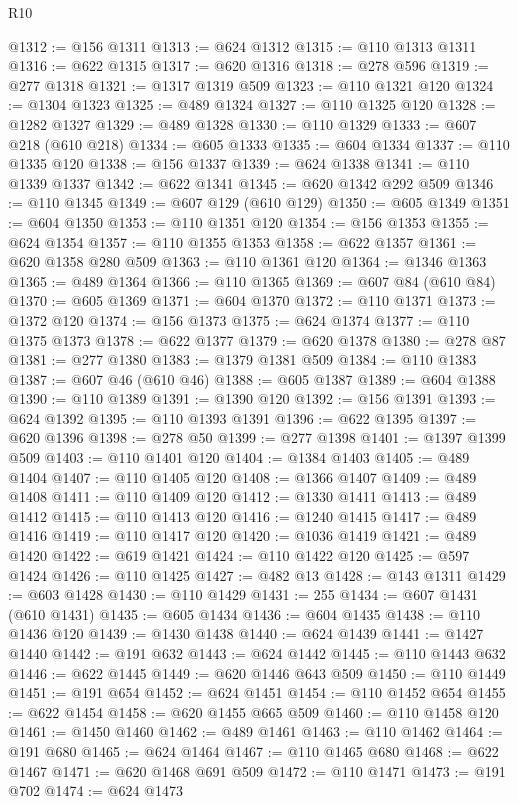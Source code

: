 \begin{lexlean}{R10}
\begin{coremodule}
@1312 := @156 @1311
@1313 := @624 @1312
@1315 := @110 @1313 @1311
@1316 := @622 @1315
@1317 := @620 @1316
@1318 := @278 @596
@1319 := @277 @1318
@1321 := @1317 @1319 @509
@1323 := @110 @1321 @120
@1324 := @1304 @1323
@1325 := @489 @1324
@1327 := @110 @1325 @120
@1328 := @1282 @1327
@1329 := @489 @1328
@1330 := @110 @1329
@1333 := @607 @218 (@610 @218)
@1334 := @605 @1333
@1335 := @604 @1334
@1337 := @110 @1335 @120
@1338 := @156 @1337
@1339 := @624 @1338
@1341 := @110 @1339 @1337
@1342 := @622 @1341
@1345 := @620 @1342 @292 @509
@1346 := @110 @1345
@1349 := @607 @129 (@610 @129)
@1350 := @605 @1349
@1351 := @604 @1350
@1353 := @110 @1351 @120
@1354 := @156 @1353
@1355 := @624 @1354
@1357 := @110 @1355 @1353
@1358 := @622 @1357
@1361 := @620 @1358 @280 @509
@1363 := @110 @1361 @120
@1364 := @1346 @1363
@1365 := @489 @1364
@1366 := @110 @1365
@1369 := @607 @84 (@610 @84)
@1370 := @605 @1369
@1371 := @604 @1370
@1372 := @110 @1371
@1373 := @1372 @120
@1374 := @156 @1373
@1375 := @624 @1374
@1377 := @110 @1375 @1373
@1378 := @622 @1377
@1379 := @620 @1378
@1380 := @278 @87
@1381 := @277 @1380
@1383 := @1379 @1381 @509
@1384 := @110 @1383
@1387 := @607 @46 (@610 @46)
@1388 := @605 @1387
@1389 := @604 @1388
@1390 := @110 @1389
@1391 := @1390 @120
@1392 := @156 @1391
@1393 := @624 @1392
@1395 := @110 @1393 @1391
@1396 := @622 @1395
@1397 := @620 @1396
@1398 := @278 @50
@1399 := @277 @1398
@1401 := @1397 @1399 @509
@1403 := @110 @1401 @120
@1404 := @1384 @1403
@1405 := @489 @1404
@1407 := @110 @1405 @120
@1408 := @1366 @1407
@1409 := @489 @1408
@1411 := @110 @1409 @120
@1412 := @1330 @1411
@1413 := @489 @1412
@1415 := @110 @1413 @120
@1416 := @1240 @1415
@1417 := @489 @1416
@1419 := @110 @1417 @120
@1420 := @1036 @1419
@1421 := @489 @1420
@1422 := @619 @1421
@1424 := @110 @1422 @120
@1425 := @597 @1424
@1426 := @110 @1425
@1427 := @482 @13
@1428 := @143 @1311
@1429 := @603 @1428
@1430 := @110 @1429
@1431 := 255
@1434 := @607 @1431 (@610 @1431)
@1435 := @605 @1434
@1436 := @604 @1435
@1438 := @110 @1436 @120
@1439 := @1430 @1438
@1440 := @624 @1439
@1441 := @1427 @1440
@1442 := @191 @632
@1443 := @624 @1442
@1445 := @110 @1443 @632
@1446 := @622 @1445
@1449 := @620 @1446 @643 @509
@1450 := @110 @1449
@1451 := @191 @654
@1452 := @624 @1451
@1454 := @110 @1452 @654
@1455 := @622 @1454
@1458 := @620 @1455 @665 @509
@1460 := @110 @1458 @120
@1461 := @1450 @1460
@1462 := @489 @1461
@1463 := @110 @1462
@1464 := @191 @680
@1465 := @624 @1464
@1467 := @110 @1465 @680
@1468 := @622 @1467
@1471 := @620 @1468 @691 @509
@1472 := @110 @1471
@1473 := @191 @702
@1474 := @624 @1473

\end{coremodule}
\end{lexlean}
